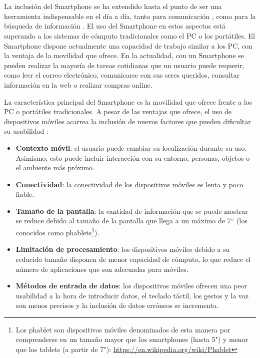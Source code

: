 \chapter{\introduction}
\label{cha:Intro}

La inclusión del Smartphone se ha extendido hasta el punto de ser una herramienta indispensable en el día a día, tanto para comunicación \cite{Montag2015}, como para la búsqueda de información \cite{Wang2016}. El uso del Smartphone en estos aspectos está superando a los sistemas de cómputo tradicionales como el PC o los portátiles. El Smartphone dispone actualmente una capacidad de trabajo similar a los PC, con la ventaja de la movilidad que ofrece. En la actualidad, con un Smartphone se pueden realizar la mayoría de tareas cotidianas que un usuario puede requerir, como leer el correo electrónico, comunicarse con sus seres queridos, consultar información en la web o realizar compras online.

La característica principal del Smartphone es la movilidad que ofrece frente a los PC o portátiles tradicionales. A pesar de las ventajas que ofrece, el uso de dispositivos móviles acarrea la inclusión de nuevos factores que pueden dificultar su usabilidad \cite{zhang2005challenges}:
\begin{itemize}
	\item \textbf{Contexto móvil}: el usuario puede cambiar su localización durante su uso. Asimismo, esto puede incluir interacción con su entorno, personas, objetos o el ambiente más próximo.
	\item \textbf{Conectividad}: la conectividad de los dispositivos móviles es lenta y poco fiable.
	\item \textbf{Tamaño de la pantalla}: la cantidad de información que se puede mostrar se reduce debido al tamaño de la pantalla que llega a un máximo de 7`` (los conocidos como phablets\footnote{Los phablet son dispositivos móviles denominados de esta manera por comprenderse en un tamaño mayor que los smartphones (hasta 5") y menor que los tablets (a partir de 7"): \url{https://en.wikipedia.org/wiki/Phablet}}).
	\item \textbf{Limitación de procesamiento}: los dispositivos móviles debido a su reducido tamaño disponen de menor capacidad de cómputo, lo que reduce el número de aplicaciones que son adecuadas para móviles.
	\item \textbf{Métodos de entrada de datos}: los dispositivos móviles ofrecen una peor usabilidad a la hora de introducir datos, el teclado táctil, los gestos y la voz son menos precisos y la inclusión de datos erróneos se incrementa\cite{Flood2011Tedious}. 
\end{itemize}

